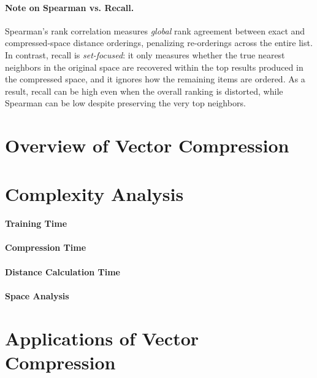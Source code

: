 \documentclass[sigconf]{acmart}
\begin{document}
\paragraph{Note on Spearman vs. Recall.}
Spearman's rank correlation measures \emph{global} rank agreement between exact and compressed-space distance orderings, penalizing re-orderings across the entire list. In contrast, recall is \emph{set-focused}: it only measures whether the true nearest neighbors in the original space are recovered within the top results produced in the compressed space, and it ignores how the remaining items are ordered. As a result, recall can be high even when the overall ranking is
distorted, while Spearman can be low despite preserving the very top neighbors.

\section{Overview of Vector Compression}


\section{Complexity Analysis}
\paragraph{Training Time}


\paragraph{Compression Time}

\paragraph{Distance Calculation Time}

\paragraph{Space Analysis}

\section{Applications of Vector Compression}

\end{document}
